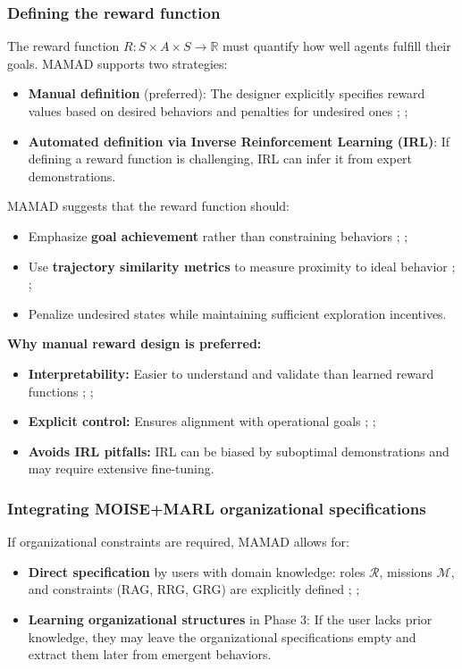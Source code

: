 \documentclass[pdflatex,sn-mathphys-num]{sn-jnl}%
\theoremstyle{thmstyleone}%
\theoremstyle{thmstyletwo}%
\theoremstyle{thmstylethree}%
\begin{document}
\subsubsection{Defining the reward function}
The reward function $R: S \times A \times S \to \mathbb{R}$ must quantify how well agents fulfill their goals. MAMAD supports two strategies:
\begin{itemize}
    \item \textbf{Manual definition} (preferred): The designer explicitly specifies reward values based on desired behaviors and penalties for undesired ones ; ;
    \item \textbf{Automated definition via Inverse Reinforcement Learning (IRL)}: If defining a reward function is challenging, IRL can infer it from expert demonstrations.
\end{itemize}

MAMAD suggests that the reward function should:
\begin{itemize}
    \item Emphasize \textbf{goal achievement} rather than constraining behaviors ; ;
    \item Use \textbf{trajectory similarity metrics} to measure proximity to ideal behavior ; ;
    \item Penalize undesired states while maintaining sufficient exploration incentives.
\end{itemize}

\noindent \textbf{Why manual reward design is preferred:}
\begin{itemize}
    \item \textbf{Interpretability:} Easier to understand and validate than learned reward functions ; ;
    \item \textbf{Explicit control:} Ensures alignment with operational goals ; ;
    \item \textbf{Avoids IRL pitfalls:} IRL can be biased by suboptimal demonstrations and may require extensive fine-tuning.
\end{itemize}

\subsubsection{Integrating MOISE+MARL organizational specifications}
If organizational constraints are required, MAMAD allows for:
\begin{itemize}
    \item \textbf{Direct specification} by users with domain knowledge: roles $\mathcal{R}$, missions $\mathcal{M}$, and constraints (RAG, RRG, GRG) are explicitly defined ; ;
    \item \textbf{Learning organizational structures} in Phase 3: If the user lacks prior knowledge, they may leave the organizational specifications empty and extract them later from emergent behaviors.
\end{itemize}
\end{document}
